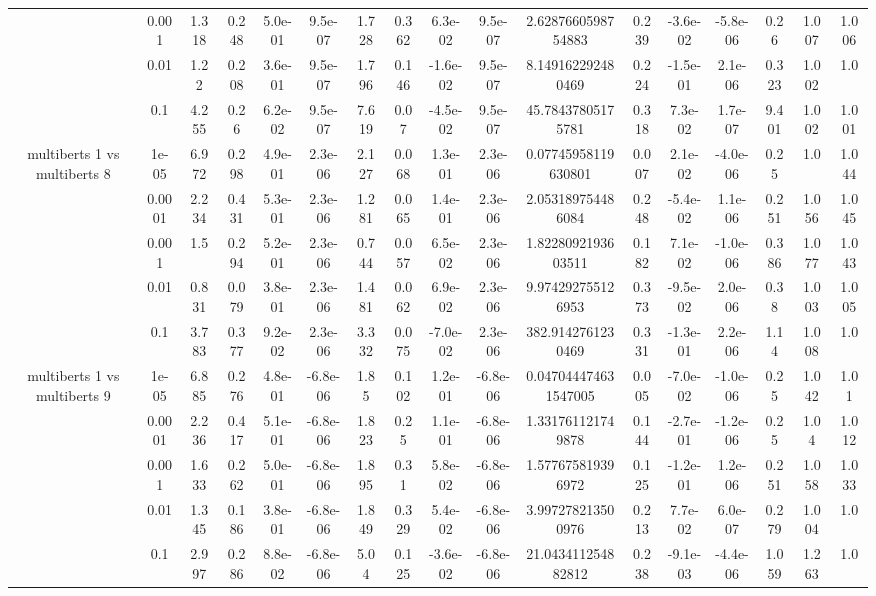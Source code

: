 \begin{tabular}{|c|c|c|c|c|c|c|c|c|c|c|c|c|c|c|c|c|}
 & 0.001 & 1.318 & 0.248 & 5.0e-01 & 9.5e-07 & 1.728 & 0.362 & 6.3e-02 & 9.5e-07 & 2.6287660598754883 & 0.239 & -3.6e-02 & -5.8e-06 & 0.26 & 1.007 & 1.006 \\
 & 0.01 & 1.22 & 0.208 & 3.6e-01 & 9.5e-07 & 1.796 & 0.146 & -1.6e-02 & 9.5e-07 & 8.149162292480469 & 0.224 & -1.5e-01 & 2.1e-06 & 0.323 & 1.002 & 1.0 \\
 & 0.1 & 4.255 & 0.26 & 6.2e-02 & 9.5e-07 & 7.619 & 0.07 & -4.5e-02 & 9.5e-07 & 45.78437805175781 & 0.318 & 7.3e-02 & 1.7e-07 & 9.401 & 1.002 & 1.001 \\
\hline
\multirow{5}{*}{multiberts 1 vs multiberts 8} & 1e-05 & 6.972 & 0.298 & 4.9e-01 & 2.3e-06 & 2.127 & 0.068 & 1.3e-01 & 2.3e-06 & 0.07745958119630801 & 0.007 & 2.1e-02 & -4.0e-06 & 0.25 & 1.0 & 1.044 \\
 & 0.0001 & 2.234 & 0.431 & 5.3e-01 & 2.3e-06 & 1.281 & 0.065 & 1.4e-01 & 2.3e-06 & 2.053189754486084 & 0.248 & -5.4e-02 & 1.1e-06 & 0.251 & 1.056 & 1.045 \\
 & 0.001 & 1.5 & 0.294 & 5.2e-01 & 2.3e-06 & 0.744 & 0.057 & 6.5e-02 & 2.3e-06 & 1.8228092193603511 & 0.182 & 7.1e-02 & -1.0e-06 & 0.386 & 1.077 & 1.043 \\
 & 0.01 & 0.831 & 0.079 & 3.8e-01 & 2.3e-06 & 1.481 & 0.062 & 6.9e-02 & 2.3e-06 & 9.974292755126953 & 0.373 & -9.5e-02 & 2.0e-06 & 0.38 & 1.003 & 1.005 \\
 & 0.1 & 3.783 & 0.377 & 9.2e-02 & 2.3e-06 & 3.332 & 0.075 & -7.0e-02 & 2.3e-06 & 382.9142761230469 & 0.331 & -1.3e-01 & 2.2e-06 & 1.14 & 1.008 & 1.0 \\
\hline
\multirow{5}{*}{multiberts 1 vs multiberts 9} & 1e-05 & 6.885 & 0.276 & 4.8e-01 & -6.8e-06 & 1.85 & 0.102 & 1.2e-01 & -6.8e-06 & 0.047044474631547005 & 0.005 & -7.0e-02 & -1.0e-06 & 0.25 & 1.042 & 1.01 \\
 & 0.0001 & 2.236 & 0.417 & 5.1e-01 & -6.8e-06 & 1.823 & 0.25 & 1.1e-01 & -6.8e-06 & 1.331761121749878 & 0.144 & -2.7e-01 & -1.2e-06 & 0.25 & 1.04 & 1.012 \\
 & 0.001 & 1.633 & 0.262 & 5.0e-01 & -6.8e-06 & 1.895 & 0.31 & 5.8e-02 & -6.8e-06 & 1.577675819396972 & 0.125 & -1.2e-01 & 1.2e-06 & 0.251 & 1.058 & 1.033 \\
 & 0.01 & 1.345 & 0.186 & 3.8e-01 & -6.8e-06 & 1.849 & 0.329 & 5.4e-02 & -6.8e-06 & 3.997278213500976 & 0.213 & 7.7e-02 & 6.0e-07 & 0.279 & 1.004 & 1.0 \\
 & 0.1 & 2.997 & 0.286 & 8.8e-02 & -6.8e-06 & 5.04 & 0.125 & -3.6e-02 & -6.8e-06 & 21.043411254882812 & 0.238 & -9.1e-03 & -4.4e-06 & 1.059 & 1.263 & 1.0 \\

\end{tabular}
